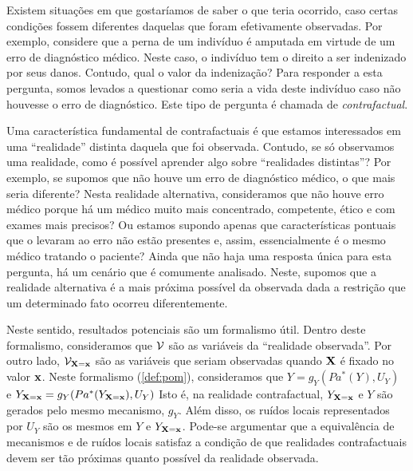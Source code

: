 Existem situações em que gostaríamos de saber
o que teria ocorrido, caso certas condições fossem diferentes
daquelas que foram efetivamente observadas.
Por exemplo, considere que a perna de um indivíduo é amputada
em virtude de um erro de diagnóstico médico.
Neste caso, o indivíduo tem o direito 
a ser indenizado por seus danos.
Contudo, qual o valor da indenização?
Para responder a esta pergunta,
somos levados a questionar 
como seria a vida deste indivíduo 
caso não houvesse o erro de diagnóstico.
Este tipo de pergunta é chamada de \textit{contrafactual}.

Uma característica fundamental de contrafactuais é que
estamos interessados em uma ``realidade'' distinta
daquela que foi observada.
Contudo, se só observamos uma realidade,
como é possível aprender algo sobre ``realidades distintas''?
Por exemplo, se supomos que 
não houve um erro de diagnóstico médico,
o que mais seria diferente?
Nesta realidade alternativa, consideramos que
não houve erro médico porque
há um médico muito mais concentrado, competente, 
ético e com exames mais precisos?
Ou estamos supondo apenas que
características pontuais que o levaram ao erro não estão presentes e,
assim, essencialmente é o mesmo médico tratando o paciente?
Ainda que não haja uma resposta única para esta pergunta,
há um cenário que é comumente analisado.
Neste, supomos que a realidade alternativa é 
a mais próxima possível da observada dada
a restrição que um determinado fato ocorreu diferentemente.

Neste sentido, resultados potenciais são um formalismo útil.
Dentro deste formalismo, consideramos que 
${\mathcal V}$ são as variáveis da ``realidade observada''.
Por outro lado, ${\mathcal V}_{{\mathbf{X}}={\mathbf{x}}}$ são
as variáveis que seriam observadas quando
${\mathbf{X}}$ é fixado no valor ${\mathbf{x}}$.
Neste formalismo (\cref{def:pom}), consideramos que
$Y = g_Y(Pa^*(Y), U_Y)$ e
$Y_{{\mathbf{X}}={\mathbf{x}}} = g_Y(Pa^*(Y_{{\mathbf{X}}={\mathbf{x}}}), U_Y)$
Isto é, na realidade contrafactual,
$Y_{{\mathbf{X}}={\mathbf{x}}}$ e $Y$ são gerados pelo mesmo mecanismo, $g_Y$.
Além disso, os ruídos locais representados por $U_Y$ são
os mesmos em $Y$ e $Y_{{\mathbf{X}}={\mathbf{x}}}$.
Pode-se argumentar que a equivalência de mecanismos
e de ruídos locais satisfaz a condição de que
realidades contrafactuais devem ser
tão próximas quanto possível da realidade observada.

